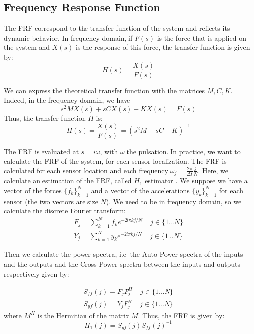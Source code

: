 \documentclass[journal]{IEEEtran}
\begin{document}
\subsection{Frequency Response Function}

The FRF correspond to the transfer function of the system and reflects its dynamic behavior. In frequency domain, if $F(s)$ is the force that is applied on the system and $X(s)$ is the response of this force, the transfer function is given by:
\begin{equation}
H(s) = \frac{X(s)}{F(s)}
\end{equation}

We can express the theoretical transfer function with the matrices $M, C, K$. Indeed, in the frequency domain, we have
\begin{equation}
s^2 M X(s) + s C X(s) + K X(s) = F(s)
\end{equation}
Thus, the transfer function $H$ is:
\begin{equation}
H(s) = \frac{X(s)}{F(s)} = (s^2 M + s C + K)^{-1}
\label{changes}
\end{equation}

The FRF is evaluated at $s = i \omega$, with $\omega$ the pulsation.
In practice, we want to calculate the FRF of the system, for each sensor localization.
The FRF is calculated for each sensor location and each frequency $\omega_j = \frac{2\pi}{\Delta t} \frac{j}{N}$.
Here, we calculate an estimation of the FRF, called $H_1$ estimator \cite{cauberghe2004applied}. We suppose we have a vector of the forces $\{ f_k\}_{k=1}^N$ and a vector of the accelerations $\{ y_k\}_{k=1}^N$ for each sensor (the two vectors are size $N$). We need to be in frequency domain, so we calculate the discrete Fourier transform:
\begin{equation}
\begin{array}{ll}
F_j = \sum\limits_{k=1}^N f_k e^{-2i\pi kj/N} \ \ \ \ \ j \in \{1 ... N\} \\
Y_j = \sum\limits_{k=1}^N y_k e^{-2i\pi kj/N} \ \ \ \ \ j \in \{1 ... N\}
\end{array}
\end{equation}

Then we calculate the power spectra, i.e. the Auto Power spectra of the inputs and the outputs
and the Cross Power spectra between the inputs and outputs respectively given by:

\begin{equation}
\begin{array}{ll}
S_{ff}(j) = F_j F_j^H \ \ \ \ \ j \in \{1 ... N\} \\
S_{yf}(j) = Y_j F_j^H \ \ \ \ \ j \in \{1 ... N\}
\end{array}
\end{equation}
where $M^H$ is the Hermitian of the matrix $M$. Thus, the FRF is given by:
\begin{equation}
H_1(j) = S_{yf}(j) S_{ff}(j)^{-1}
\end{equation}
\end{document}
